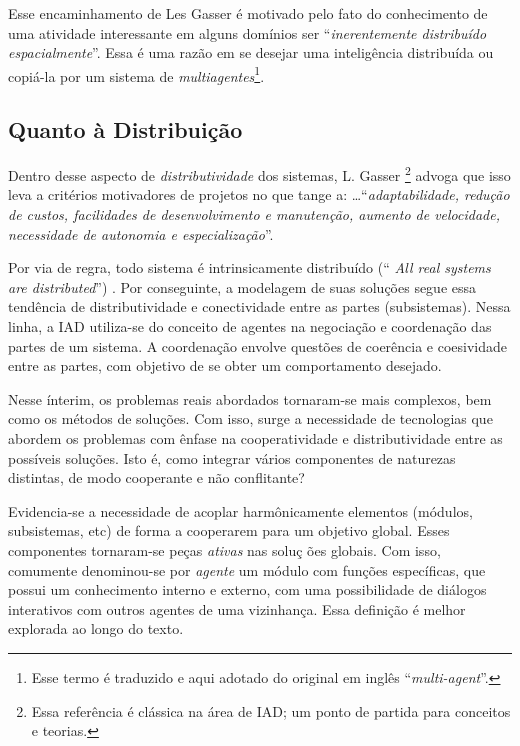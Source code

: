 \documentclass[12pt,final,a4paper]{article}
\theoremstyle{definition}
\begin{document}
Esse encaminhamento de Les Gasser \cite{gasser91a} é motivado pelo fato
 do conhecimento de uma atividade interessante em alguns domínios ser 
 ``{\em inerentemente distribuído espacialmente}''. Essa é uma
razão em se desejar uma intelig\^{e}ncia distribuída ou
copi\'{a}-la por um sistema  de {\em multiagentes}\footnote{Esse termo \'e 
traduzido e aqui adotado do original em ingl\^es  ``{\em multi-agent}''.}.

\subsection{Quanto  \`{a}  Distribuição}

Dentro desse aspecto de {\em distributividade} dos sistemas, L. Gasser \cite
{gasser91a}\footnote{Essa refer\^encia \'e cl\'assica na \'area de IAD; um
 ponto de partida para
 conceitos e teorias.} advoga que isso leva a critérios motivadores de
projetos no que tange a: \ldots ``{\em adaptabilidade, redução de
custos, facilidades de desenvolvimento e manutenção, aumento de
velocidade, necessidade de autonomia e especialização}''.

Por via de regra, todo sistema é intrinsicamente distribuído (``%
{\em All real systems are distributed}'') \cite{gashu89}. Por conseguinte, a
modelagem de suas soluções segue essa tend\^{e}ncia de
distributividade e conectividade entre as partes (subsistemas). Nessa linha,
a IAD utiliza-se do conceito de agentes na negociação e coordenação das partes de um sistema. A coordenação  envolve questões
de coer\^{e}ncia e coesividade entre as partes, com objetivo de se obter um
comportamento desejado.

Nesse ínterim, os problemas reais abordados tornaram-se mais complexos, bem como os métodos de soluções. Com isso, surge a necessidade de
tecnologias que abordem os problemas com \^{e}nfase na cooperatividade e
distributividade entre as possíveis soluções. Isto é, como
integrar v\'{a}rios componentes de naturezas distintas, de modo cooperante e
não conflitante?

Evidencia-se a necessidade de acoplar harm\^{o}nicamente elementos
(m\'{o}dulos, subsistemas, etc) de forma a cooperarem para um objetivo
global. Esses componentes tornaram-se peças {\em ativas} nas soluç%
ões globais. Com isso, comumente denominou-se por {\em agente} um
m\'{o}dulo com funções específicas, que possui um conhecimento
interno e externo, com uma possibilidade de di\'{a}logos interativos com
outros agentes de uma vizinhança. Essa definição é melhor
explorada ao longo do texto.
\end{document}
